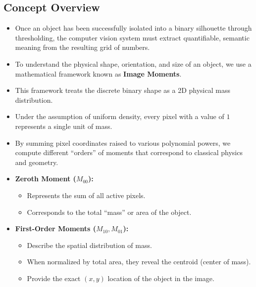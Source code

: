 \documentclass[12pt]{article}
\begin{document}
\subsection{Concept Overview}
\begin{itemize}
    \item Once an object has been successfully isolated into a binary silhouette through thresholding, the computer vision system must extract quantifiable, semantic meaning from the resulting grid of numbers.

    \item To understand the physical shape, orientation, and size of an object, we use a mathematical framework known as \textbf{Image Moments}.

    \item This framework treats the discrete binary shape as a 2D physical mass distribution.

    \item Under the assumption of uniform density, every pixel with a value of $1$ represents a single unit of mass.

    \item By summing pixel coordinates raised to various polynomial powers, we compute different ``orders'' of moments that correspond to classical physics and geometry.

    \item \textbf{Zeroth Moment ($M_{00}$):}
          \begin{itemize}
              \item Represents the sum of all active pixels.
              \item Corresponds to the total ``mass'' or area of the object.
          \end{itemize}

    \item \textbf{First-Order Moments ($M_{10}, M_{01}$):}
          \begin{itemize}
              \item Describe the spatial distribution of mass.
              \item When normalized by total area, they reveal the centroid (center of mass).
              \item Provide the exact $(x, y)$ location of the object in the image.
          \end{itemize}


\end{itemize}
\end{document}
